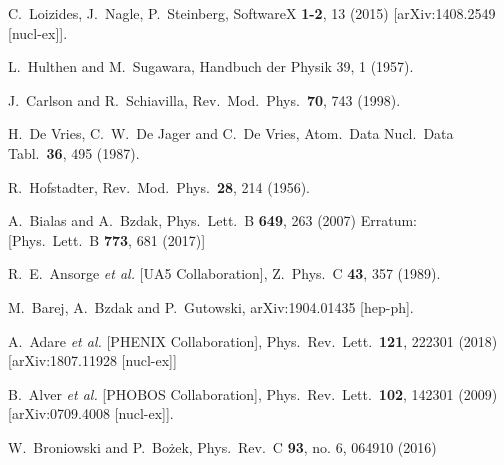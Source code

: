 \documentclass[a4paper,12pt]{article}
\begin{document}
\begin{thebibliography}{9}
  C.~Loizides, J.~Nagle, P.~Steinberg,
  SoftwareX {\bf 1-2}, 13 (2015)
  [arXiv:1408.2549 [nucl-ex]].

  L.~Hulthen and M.~Sugawara, Handbuch der Physik 39, 1 (1957).

  J.~Carlson and R.~Schiavilla,
  Rev.\ Mod.\ Phys.\  {\bf 70}, 743 (1998).

  H.~De Vries, C.~W.~De Jager and C.~De Vries,
  Atom.\ Data Nucl.\ Data Tabl.\  {\bf 36}, 495 (1987).

  R.~Hofstadter,
  Rev.\ Mod.\ Phys.\  {\bf 28}, 214 (1956).

  A.~Bialas and A.~Bzdak,
  Phys.\ Lett.\ B {\bf 649}, 263 (2007)
  Erratum: [Phys.\ Lett.\ B {\bf 773}, 681 (2017)]

  R.~E.~Ansorge {\it et al.} [UA5 Collaboration],
  Z.\ Phys.\ C {\bf 43}, 357 (1989).

  M.~Barej, A.~Bzdak and P.~Gutowski,
  arXiv:1904.01435 [hep-ph].

  A.~Adare {\it et al.} [PHENIX Collaboration],
  Phys.\ Rev.\ Lett.\ {\bf 121}, 222301 (2018) [arXiv:1807.11928 [nucl-ex]]

  B.~Alver {\it et al.} [PHOBOS Collaboration],
  Phys.\ Rev.\ Lett.\  {\bf 102}, 142301 (2009)
  [arXiv:0709.4008 [nucl-ex]].

  W.~Broniowski and P.~Bożek,
  Phys.\ Rev.\ C {\bf 93}, no. 6, 064910 (2016)






\end{thebibliography}
\end{document}
